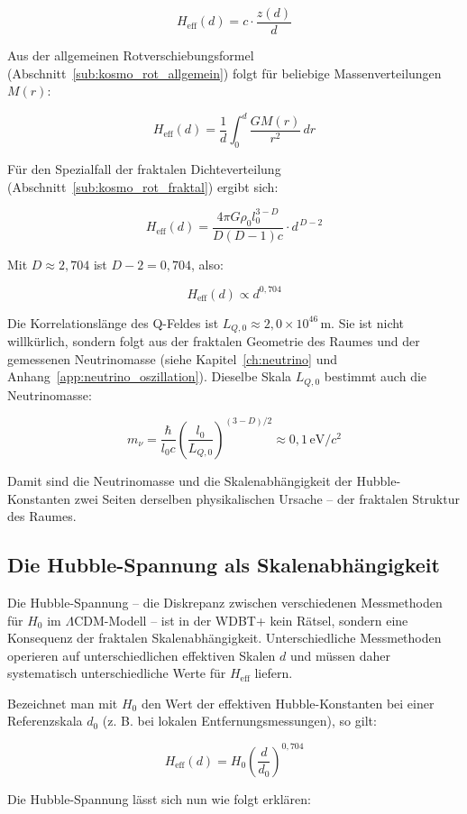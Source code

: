\[
H_{\text{eff}}(d) = c \cdot \frac{z(d)}{d}
\]

Aus der allgemeinen Rotverschiebungsformel (Abschnitt~\ref{sub:kosmo_rot_allgemein}) folgt für beliebige Massenverteilungen \( M(r) \):

\[
H_{\text{eff}}(d) = \frac{1}{d} \int_0^d \frac{GM(r)}{r^2} \, dr
\]

Für den Spezialfall der fraktalen Dichteverteilung (Abschnitt~\ref{sub:kosmo_rot_fraktal}) ergibt sich:

\[
H_{\text{eff}}(d) = \frac{4\pi G \rho_0 l_0^{3-D}}{D(D-1)c} \cdot d^{\,D-2}
\]

Mit \( D \approx 2,704 \) ist \( D-2 = 0,704 \), also:

\[
H_{\text{eff}}(d) \propto d^{0,704}
\]

Die Korrelationslänge des Q-Feldes ist \( L_{Q,0} \approx 2{,}0 \times 10^{46} \, \text{m} \). Sie ist nicht willkürlich, sondern folgt aus der fraktalen Geometrie des Raumes und der gemessenen Neutrinomasse (siehe Kapitel~\ref{ch:neutrino} und Anhang~\ref{app:neutrino_oszillation}). Dieselbe Skala \( L_{Q,0} \) bestimmt auch die Neutrinomasse:

\[
m_\nu = \frac{\hbar}{l_0 c} \left( \frac{l_0}{L_{Q,0}} \right)^{(3-D)/2} \approx 0,1 \, \text{eV}/c^2
\]

Damit sind die Neutrinomasse und die Skalenabhängigkeit der Hubble-Konstanten zwei Seiten derselben physikalischen Ursache – der fraktalen Struktur des Raumes.

\subsection{Die Hubble-Spannung als Skalenabhängigkeit}
\label{sub:kosmo_hubble_spannung}

Die Hubble-Spannung – die Diskrepanz zwischen verschiedenen Messmethoden für \( H_0 \) im \(\Lambda\)CDM-Modell – ist in der WDBT+ kein Rätsel, sondern eine Konsequenz der fraktalen Skalenabhängigkeit. Unterschiedliche Messmethoden operieren auf unterschiedlichen effektiven Skalen \( d \) und müssen daher systematisch unterschiedliche Werte für \( H_{\text{eff}} \) liefern.

Bezeichnet man mit \( H_0 \) den Wert der effektiven Hubble-Konstanten bei einer Referenzskala \( d_0 \) (z. B. bei lokalen Entfernungsmessungen), so gilt:

\[
H_{\text{eff}}(d) = H_0 \left( \frac{d}{d_0} \right)^{0,704}
\]

Die Hubble-Spannung lässt sich nun wie folgt erklären:

